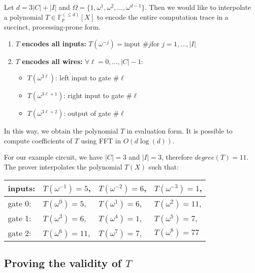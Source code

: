 \documentclass[../lecture-notes.tex]{subfiles}
\begin{document}
Let \(d = 3|C| + |I|\) and \(\Omega = \{1, \omega^1, \omega^2, \dots, \omega^{d-1}\}\). Then we would like to interpolate a polynomial \(T \in \mathbb{F}_p^{(\leq d)}[X]\) to encode the entire computation trace in a succinct, processing-prone form.

\begin{enumerate}
    \item \(T\) \textbf{encodes all inputs:} \( T(\omega^{-j}) = \text{input \#} j \text{for } j = 1, \dots, |I| \)
    \item \(T\) \textbf{encodes all wires:} \( \forall \ell = 0, \dots, |C| - 1: \)
    \begin{itemize}
        \item \( T(\omega^{3\ell}) \): left input to gate \#\( \ell \)
        \item \( T(\omega^{3\ell+1}) \): right input to gate \#\( \ell \)
        \item \( T(\omega^{3\ell+2}) \): output of gate \#\( \ell \)
    \end{itemize}
\end{enumerate}

\begin{remark}
In this way, we obtain the polynomial \(T\) in evaluation form. It is possible to compute coefficients of \(T\) using FFT in \(O(d\log(d))\).
\end{remark}

\begin{example}
For our example circuit, we have \(|C| = 3\) and \(|I| = 3\), therefore \(degree(T) = 11\). The prover interpolates the polynomial \(T(X)\) such that:
\\
\begin{tabular}{l l l l}
  inputs: & $T(\omega^{-1}) = 5$, & $T(\omega^{-2}) = 6$, & $T(\omega^{-3}) = 1$, \\ \hline
  gate 0: & $T(\omega^{0}) = 5$, & $T(\omega^{1}) = 6$, & $T(\omega^{2}) = 11$, \\
  gate 1: & $T(\omega^{3}) = 6$, & $T(\omega^{4}) = 1$, & $T(\omega^{5}) = 7$, \\
  gate 2: & $T(\omega^{6}) = 11$, & $T(\omega^{7}) = 7$, & $T(\omega^{8}) = 77$ \\ 
\end{tabular}

\end{example}

\subsection{Proving the validity of \texorpdfstring{\(T\)}{T}}
\end{document}
